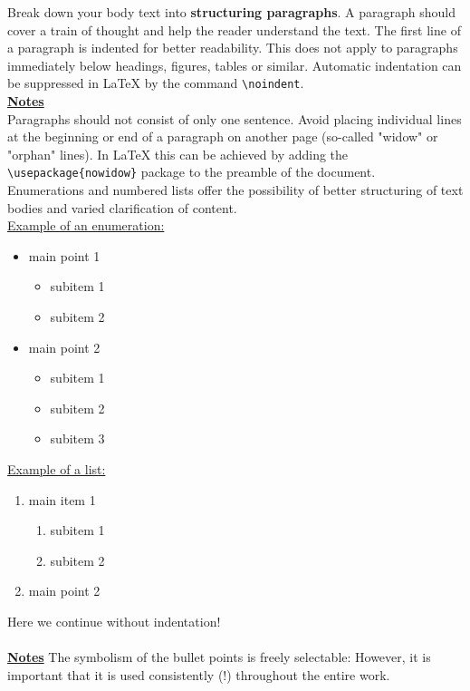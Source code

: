 \noindent
Break down your body text into \textbf{structuring paragraphs}. A paragraph should cover a train of thought and help the reader understand the text. The first line of a paragraph is indented for better readability. This does not apply to paragraphs immediately below headings, figures, tables or similar. Automatic indentation can be suppressed in \LaTeX { by} the command \verb!\noindent!. \\

\noindent
\textbf{\uline{Notes}}\\
Paragraphs should not consist of only one sentence. Avoid placing individual lines at the beginning or end of a paragraph on another page (so-called "widow" or "orphan" lines). In \LaTeX { this} can be achieved by adding the \verb!\usepackage{nowidow}! package to the preamble of the document.\\

Enumerations and numbered lists offer the possibility of better structuring of text bodies and varied clarification of content.\\  

\noindent
\uline{Example of an enumeration:} 
\begin{itemize}
    \item main point 1
    \begin{itemize}
        \item subitem 1
        \item subitem 2
    \end{itemize}
    \item main point 2
    \begin{itemize}
        \item subitem 1
        \item subitem 2
        \item subitem 3
    \end{itemize}
\end{itemize}

\noindent
\uline{Example of a list: }
\begin{enumerate}
    \item main item 1
    \begin{enumerate}
        \item subitem 1
        \item subitem 2
    \end{enumerate}
    \item main point 2
\end{enumerate}

Here we continue without indentation!\\
\\
\textbf{\uline{Notes}}
The symbolism of the bullet points is freely selectable: However, it is important that it is used consistently (!) throughout the entire work. 

